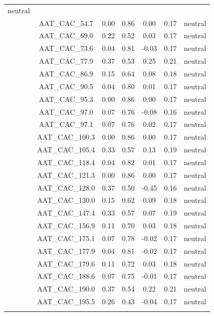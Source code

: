 \documentclass[11pt,]{article}
\begin{document}
\begin{longtable}[c]{@{}lcccccc@{}}
neutral
\\\addlinespace
& AAT\_CAC\_54.7 & 0.00 & 0.86 & 0.00 & 0.17 & neutral
\\\addlinespace
& AAT\_CAC\_69.0 & 0.22 & 0.52 & 0.03 & 0.17 & neutral
\\\addlinespace
& AAT\_CAC\_73.6 & 0.04 & 0.81 & -0.03 & 0.17 & neutral
\\\addlinespace
& AAT\_CAC\_77.9 & 0.37 & 0.53 & 0.25 & 0.21 & neutral
\\\addlinespace
& AAT\_CAC\_86.9 & 0.15 & 0.64 & 0.08 & 0.18 & neutral
\\\addlinespace
& AAT\_CAC\_90.5 & 0.04 & 0.80 & 0.01 & 0.17 & neutral
\\\addlinespace
& AAT\_CAC\_95.3 & 0.00 & 0.86 & 0.00 & 0.17 & neutral
\\\addlinespace
& AAT\_CAC\_97.0 & 0.07 & 0.76 & -0.08 & 0.16 & neutral
\\\addlinespace
& AAT\_CAC\_97.1 & 0.07 & 0.76 & 0.02 & 0.17 & neutral
\\\addlinespace
& AAT\_CAC\_100.3 & 0.00 & 0.86 & 0.00 & 0.17 & neutral
\\\addlinespace
& AAT\_CAC\_105.4 & 0.33 & 0.57 & 0.13 & 0.19 & neutral
\\\addlinespace
& AAT\_CAC\_118.4 & 0.04 & 0.82 & 0.01 & 0.17 & neutral
\\\addlinespace
& AAT\_CAC\_121.3 & 0.00 & 0.86 & 0.00 & 0.17 & neutral
\\\addlinespace
& AAT\_CAC\_128.0 & 0.37 & 0.50 & -0.45 & 0.16 & neutral
\\\addlinespace
& AAT\_CAC\_130.0 & 0.15 & 0.62 & 0.09 & 0.18 & neutral
\\\addlinespace
& AAT\_CAC\_147.4 & 0.33 & 0.57 & 0.07 & 0.19 & neutral
\\\addlinespace
& AAT\_CAC\_156.9 & 0.11 & 0.70 & 0.03 & 0.18 & neutral
\\\addlinespace
& AAT\_CAC\_175.1 & 0.07 & 0.78 & -0.02 & 0.17 & neutral
\\\addlinespace
& AAT\_CAC\_177.9 & 0.04 & 0.81 & -0.02 & 0.17 & neutral
\\\addlinespace
& AAT\_CAC\_179.6 & 0.11 & 0.72 & 0.03 & 0.18 & neutral
\\\addlinespace
& AAT\_CAC\_188.6 & 0.07 & 0.75 & -0.01 & 0.17 & neutral
\\\addlinespace
& AAT\_CAC\_190.0 & 0.37 & 0.54 & 0.22 & 0.21 & neutral
\\\addlinespace
& AAT\_CAC\_195.5 & 0.26 & 0.43 & -0.04 & 0.17 & neutral
\\\addlinespace

\end{longtable}
\end{document}
